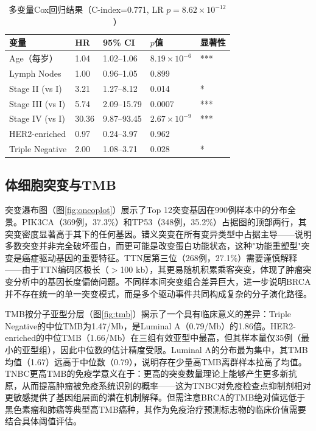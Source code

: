 \documentclass[12pt,a4paper]{ctexart}
\begin{document}
\begin{table}[H]
\centering\caption{多变量Cox回归结果（C-index=0.771, LR $p=8.62\times10^{-12}$）}\label{tab:cox}
\begin{tabular}{lllll}\toprule
变量 & HR & 95\% CI & $p$值 & 显著性 \\\midrule
Age（每岁） & 1.04 & 1.02--1.06 & $8.19\times10^{-6}$ & *** \\
Lymph Nodes & 1.00 & 0.96--1.05 & 0.899 & \\
Stage II (vs I) & 3.21 & 1.27--8.12 & 0.014 & * \\
Stage III (vs I) & 5.74 & 2.09--15.79 & 0.0007 & *** \\
Stage IV (vs I) & 30.36 & 9.87--93.45 & $2.67\times10^{-9}$ & *** \\
HER2-enriched & 0.97 & 0.24--3.97 & 0.962 & \\
Triple Negative & 2.00 & 1.08--3.71 & 0.028 & * \\\bottomrule
\end{tabular}
\end{table}

\subsection{体细胞突变与TMB}
突变瀑布图（图\ref{fig:oncoplot}）展示了Top 12突变基因在990例样本中的分布全景。PIK3CA（369例，37.3\%）和TP53（348例，35.2\%）占据图的顶部两行，其突变密度显著高于其下的任何基因。错义突变在所有变异类型中占据主导——说明多数突变并非完全破坏蛋白，而更可能是改变蛋白功能状态，这种"功能重塑型"突变是癌症驱动基因的重要特征。TTN居第三位（268例，27.1\%）需要谨慎解释——由于TTN编码区极长（$>$100 kb），其更易随机积累乘客突变，体现了肿瘤突变分析中的基因长度偏倚问题。不同样本间突变组合差异巨大，进一步说明BRCA并不存在统一的单一突变模式，而是多个驱动事件共同构成复杂的分子演化路径。

TMB按分子亚型分层（图\ref{fig:tmb}）揭示了一个具有临床意义的差异：Triple Negative的中位TMB为1.47/Mb，是Luminal A（0.79/Mb）的1.86倍。HER2-enriched的中位TMB（1.66/Mb）在三组有效亚型中最高，但其样本量仅35例（最小的亚型组），因此中位数的估计精度受限。Luminal A的分布最为集中，其TMB均值（1.67）远高于中位数（0.79），说明存在少量高TMB离群样本拉高了均值。TNBC更高TMB的免疫学意义在于：更高的突变数量理论上能够产生更多新抗原，从而提高肿瘤被免疫系统识别的概率——这为TNBC对免疫检查点抑制剂相对更敏感提供了基因组层面的潜在机制解释。但需注意BRCA的TMB绝对值远低于黑色素瘤和肺癌等典型高TMB癌种，其作为免疫治疗预测标志物的临床价值需要结合具体阈值评估。
\end{document}
